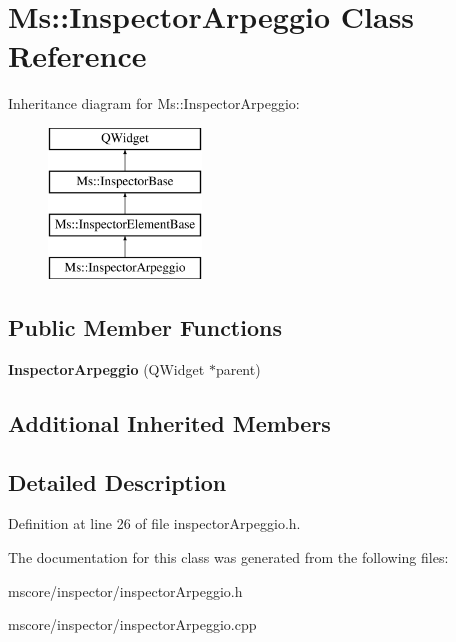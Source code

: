 \hypertarget{class_ms_1_1_inspector_arpeggio}{}\section{Ms\+:\+:Inspector\+Arpeggio Class Reference}
\label{class_ms_1_1_inspector_arpeggio}
Inheritance diagram for Ms\+:\+:Inspector\+Arpeggio\+:\begin{figure}[H]
\begin{center}
\leavevmode
\includegraphics[height=4.000000cm]{class_ms_1_1_inspector_arpeggio}
\end{center}
\end{figure}
\subsection*{Public Member Functions}
\begin{DoxyCompactItemize}
\item 
\mbox{\label{class_ms_1_1_inspector_arpeggio_a3e74da6f55051a2a346d789df6c90a6c}} 
{\bfseries Inspector\+Arpeggio} (Q\+Widget $\ast$parent)
\end{DoxyCompactItemize}
\subsection*{Additional Inherited Members}


\subsection{Detailed Description}


Definition at line 26 of file inspector\+Arpeggio.\+h.



The documentation for this class was generated from the following files\+:\begin{DoxyCompactItemize}
\item 
mscore/inspector/inspector\+Arpeggio.\+h\item 
mscore/inspector/inspector\+Arpeggio.\+cpp\end{DoxyCompactItemize}
